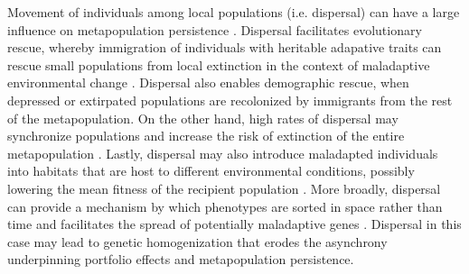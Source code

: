 \documentclass{revtex4}
\begin{document}
Movement of individuals among local populations (i.e. dispersal) can have a large influence on metapopulation persistence \citep{MilnerGulland:2011vm}. 
Dispersal facilitates evolutionary rescue, whereby immigration of individuals with heritable adapative traits can rescue small populations from local extinction in the context of maladaptive environmental change \citep{Bell:2011ki,Carlson:2014is}.
Dispersal also enables demographic rescue, when depressed or extirpated populations are recolonized by immigrants from the rest of the metapopulation.
On the other hand, high rates of dispersal may synchronize populations and increase the risk of extinction of the entire metapopulation \citep{Earn:2000fm,Satterthwaite:2015ge}. 
Lastly, dispersal may also introduce maladapted individuals into habitats that are host to different environmental conditions, possibly lowering the mean fitness of the recipient population \citep{Ronce:2001dp,Muhlfeld:2014hs}. 
More broadly, dispersal can provide a mechanism by which phenotypes are sorted in space rather than time and facilitates the spread of potentially maladaptive genes \citep{Lowe:2015ft}.
Dispersal in this case may lead to genetic homogenization that erodes the asynchrony underpinning portfolio effects and metapopulation persistence. 
\end{document}

